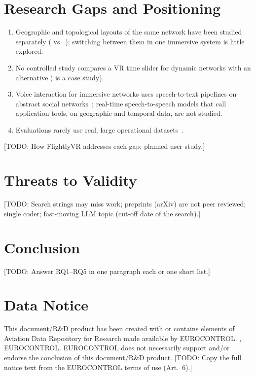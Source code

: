\documentclass[11pt,a4paper]{article}
\newif\ifshowtodos \showtodostrue
\newcommand{\todo}[2][]{\ifshowtodos{\color{red}\footnotesize[TODO: #2]}\fi}
\newcommand{\system}{FlightlyVR}
\begin{document}
\section{Research Gaps and Positioning}
\label{sec:gaps}

\begin{enumerate}[label=\textbf{G\arabic*}, leftmargin=*]
  \item Geographic and topological layouts of the same network have been studied separately
        (\cite{kwon2016study} vs.~\cite{yang2018maps,yang2019flowmaps}); switching between
        them in one immersive system is little explored.
  \item No controlled study compares a VR time slider for dynamic networks with an
        alternative (\cite{sorger2019dynamic} is a case study).
  \item Voice interaction for immersive networks uses speech-to-text pipelines on abstract
        social networks~\cite{lee2026voice}; real-time speech-to-speech models that call
        application tools, on geographic and temporal data, are not studied.
  \item Evaluations rarely use real, large operational datasets~\cite{ens2021grand}.
\end{enumerate}
\todo{How \system{} addresses each gap; planned user study.}

\section{Threats to Validity}
\label{sec:threats}
\todo{Search strings may miss work; preprints (arXiv) are not peer reviewed;
single coder; fast-moving LLM topic (cut-off date of the search).}

\section{Conclusion}
\label{sec:conclusion}
\todo{Answer RQ1--RQ5 in one paragraph each or one short list.}

\section*{Data Notice}
This document/R\&D product has been created with or contains elements of Aviation Data
Repository for Research made available by EUROCONTROL. , EUROCONTROL.
EUROCONTROL does not necessarily support and/or endorse the conclusion of this
document/R\&D product.
\todo{Copy the full notice text from the EUROCONTROL terms of use (Art.~6).}



\end{document}
